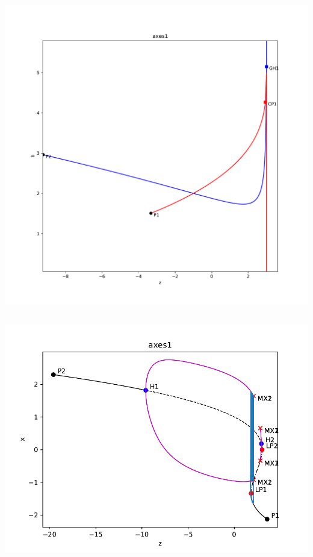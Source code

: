 \documentclass[presentation]{beamer}
\begin{document}
\begin{frame}[plain]
\begin{columns}
\begin{column}{0.5\columnwidth}
\begin{center}
\includegraphics[width=\textwidth]{dstool_2dbif.pdf}
\end{center}
\end{column}
\end{columns}


\end{frame}
\begin{frame}[plain]

\begin{center}
\includegraphics[width=\textwidth]{pydstool3.pdf}
\end{center}


\end{frame}
\end{document}
